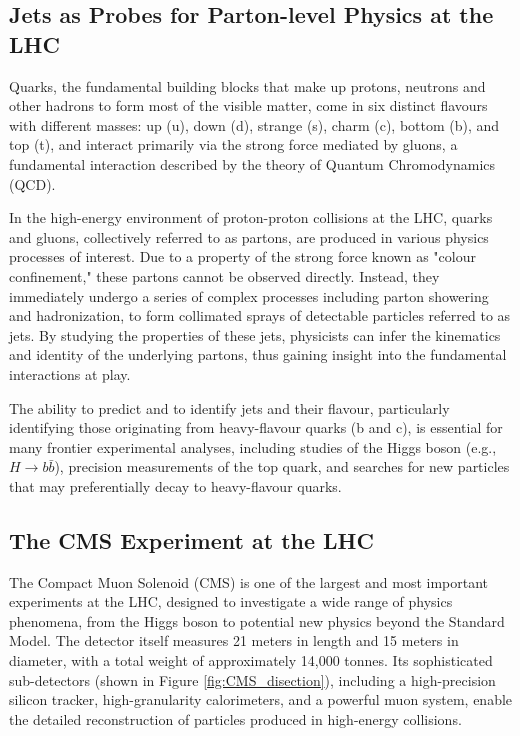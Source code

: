 \documentclass[10pt,twocolumn]{article}
\begin{document}
\subsection{Jets as Probes for Parton-level Physics at the LHC}
\label{sec:intro-jets}

Quarks, the fundamental building blocks that make up protons, neutrons and other hadrons to form most of the visible matter, come in six distinct flavours with different masses: up (u), down (d), strange (s), charm (c), bottom (b), and top (t), and interact primarily via the strong force mediated by gluons, a fundamental interaction described by the theory of Quantum Chromodynamics (QCD).

In the high-energy environment of proton-proton collisions at the LHC, quarks and gluons, collectively referred to as partons, are produced in various physics processes of interest. Due to a property of the strong force known as "colour confinement," these partons cannot be observed directly. Instead, they immediately undergo a series of complex processes including parton showering and hadronization, to form collimated sprays of detectable particles referred to as jets. By studying the properties of these jets, physicists can infer the kinematics and identity of the underlying partons, thus gaining insight into the fundamental interactions at play.

The ability to predict and to identify jets and their flavour, particularly identifying those originating from heavy-flavour quarks (b and c), is essential for many frontier experimental analyses, including studies of the Higgs boson (e.g., $H \rightarrow b\bar{b}$), precision measurements of the top quark, and searches for new particles that may preferentially decay to heavy-flavour quarks.

\subsection{The CMS Experiment at the LHC} %
\label{sec:intro-cms}

The Compact Muon Solenoid (CMS) is one of the largest and most important experiments at the LHC, designed to investigate a wide range of physics phenomena, from the Higgs boson to potential new physics beyond the Standard Model. \cite{CMS_JINST_2008, acostaCMSPhysicsTDR2006} The detector itself measures 21 meters in length and 15 meters in diameter, with a total weight of approximately 14,000 tonnes. Its sophisticated sub-detectors (shown in Figure \ref{fig:CMS_disection}), including a high-precision silicon tracker, high-granularity calorimeters, and a powerful muon system, enable the detailed reconstruction of particles produced in high-energy collisions.
\end{document}
